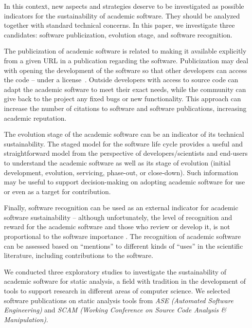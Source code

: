 In this context, new aspects and strategies deserve to be investigated as possible
indicators for the sustainability of academic software. They should be
analyzed together with standard technical concerns. In this paper, we
investigate three candidates: software publicization, evolution stage, and
software recognition.

The publicization of academic software is related to making it available
explicitly from a given URL in a publication regarding the software.
Publicization may deal with opening the development of the software so that
other developers can access the code -- under a license~\cite{SSI,SSI:2013}.
Outside developers with access to source code can adapt the academic software
to meet their exact needs, while the community can give back to the project any
fixed bugs or new functionality.  This approach can increase the number of
citations to software and software publications, increasing academic
reputation.

The evolution stage of the academic software can be an indicator of its
technical sustainability.  The staged model for the software life cycle
\cite{rajlich2000staged} provides a useful and straightforward model from the
perspective of developers/scientists and end-users to understand the academic
software as well as its stage of evolution (initial development, evolution,
servicing, phase-out, or close-down).  Such information may be useful to
support decision-making on adopting academic software for use or even as a
target for contribution. 

Finally, software recognition can be used as an external indicator 
for academic software sustainability -- although
unfortunately, the level of recognition and reward for the
academic software and those who review or develop it,
is not proportional to the software importance \cite{goble2014better}.  
The recognition of academic software can be assessed based 
on ``mentions'' to different kinds of ``uses'' 
in the scientific literature, 
including contributions to the software. 

We conducted three exploratory studies to investigate the sustainability of
academic software for static analysis, a field with tradition
in the development of tools to support research in different areas of
computer science.
We selected software publications on static analysis tools
from \textit{ASE (Automated Software Engineering)}  and
\textit{SCAM (Working Conference on Source Code Analysis \& Manipulation)}.

